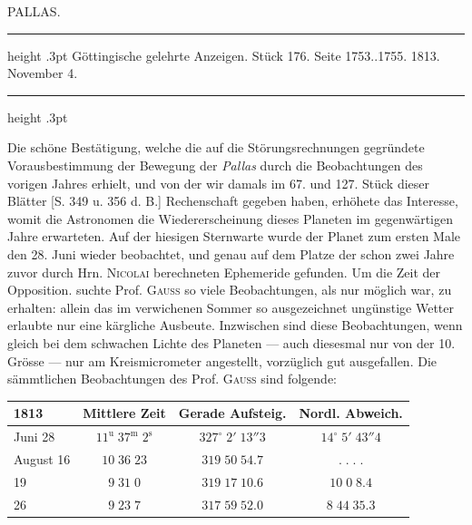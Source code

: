 \par\bigskip
{}
\hypertarget{native-374-lower}{}\label{native-374-lower}
\begin{center}\large PALLAS.\end{center}
\begin{center}
\parbox{.80\linewidth}{%
\centering\fontsize{8.2}{10.2}\selectfont
\hrule height .3pt\relax\vspace{2.5pt}
Göttingische gelehrte Anzeigen. Stück 176. Seite 1753..1755. 1813. November 4.\par
\vspace{2.5pt}\hrule height .3pt\relax
}
\end{center}

\par\indent Die schöne Bestätigung, welche die auf die Störungsrechnungen gegründete Vorausbestimmung
der Bewegung der \emph{Pallas} durch die Beobachtungen des vorigen Jahres erhielt, und von der
wir damals im 67. und 127. Stück dieser Blätter [S. 349 u. 356 d. B.] Rechenschaft gegeben
haben, erhöhete das Interesse, womit die Astronomen die Wiedererscheinung dieses Planeten im
gegenwärtigen Jahre erwarteten. Auf der hiesigen Sternwarte wurde der Planet zum ersten Male
den 28. Juni wieder beobachtet, und genau auf dem Platze der schon zwei Jahre zuvor durch
Hrn. \textsc{Nicolai} berechneten Ephemeride gefunden. Um die Zeit der Opposition. suchte
Prof. \textsc{Gauss} so viele Beobachtungen, als nur möglich war, zu erhalten: allein das im
verwichenen Sommer so ausgezeichnet ungünstige Wetter erlaubte nur eine kärgliche Ausbeute.
Inzwischen sind diese Beobachtungen, wenn gleich bei dem schwachen Lichte des Planeten ---
auch diesesmal nur von der 10. Grösse --- nur am Kreismicrometer angestellt, vorzüglich gut
ausgefallen. Die sämmtlichen Beobachtungen des Prof. \textsc{Gauss} sind folgende:

\begin{center}\fontsize{10}{12}\selectfont\setlength{\tabcolsep}{5pt}\renewcommand{\arraystretch}{1.15}\begin{tabular}{l|c|c|c}
1813 & Mittlere Zeit & Gerade Aufsteig. & Nordl. Abweich.\\\hline
Juni 28 & $11^{\mathrm u}\;37^{\mathrm m}\;2^{\mathrm s}$ & $327^\circ\;2'\;13''3$ & $14^\circ\;5'\;43''4$\\
August 16 & $10\;36\;23$ & $319\;50\;54.7$ & $.\;.\;.\;.$\\
19 & $9\;31\;0$ & $319\;17\;10.6$ & $10\;0\;8.4$\\
26 & $9\;23\;7$ & $317\;59\;52.0$ & $8\;44\;35.3$\\
\end{tabular}\end{center}

